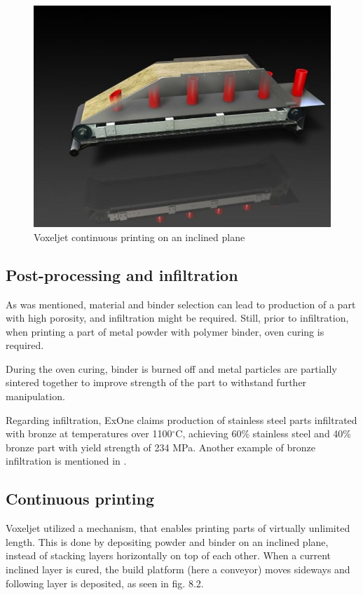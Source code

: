 \documentclass[a4paper, twoside, 11pt]{report}
\begin{document}
\begin{figure}[h]
	\centering
	\includegraphics[scale=0.8]{3ders}
	\caption{Voxeljet continuous printing on an inclined plane \cite{3ders}}
\end{figure}

\subsection{Post-processing and infiltration}
As was mentioned, material and binder selection can lead to production of a part with high porosity, and infiltration might be required. Still, prior to infiltration, when printing a part of metal powder with polymer binder, oven curing is required.

	During the oven curing, binder is burned off and metal particles are partially sintered together to improve strength of the part to withstand further manipulation.
	
	Regarding infiltration, ExOne claims production of stainless steel parts infiltrated with bronze at temperatures over 1100$^{\circ}$C, achieving 60\% stainless steel and 40\% bronze part with yield strength of 234 MPa. Another example of bronze infiltration is mentioned in \cite{xometry}.


\subsection{Continuous printing}
Voxeljet utilized a mechanism, that enables printing parts of virtually unlimited length. This is done by depositing powder and binder on an inclined plane, instead of stacking layers horizontally on top of each other. When a current inclined layer is cured, the build platform (here a conveyor) moves sideways and following layer is deposited, as seen in fig. 8.2.
\end{document}
